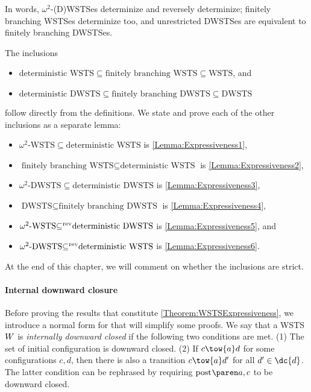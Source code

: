 \documentclass[../../diss.tex]{subfiles}
\begin{document}
In words, $\omega^2$-(D)WSTSes determinize and reversely determinize; finitely branching WSTSes determinize too, and unrestricted DWSTSes are equivalent to finitely branching DWSTSes.

The inclusions
\begin{itemize}
    \item
        $\text{deterministic WSTS} \subseteq  \text{finitely branching WSTS} \subseteq \text{WSTS}$, and
    \item
        $\text{deterministic DWSTS} \subseteq  \text{finitely branching DWSTS} \subseteq \text{DWSTS}$
\end{itemize}
follow directly from the definitions.
We state and prove each of the other inclusions as a separate lemma:
\begin{itemize}
    \item
        $\text{$\omega^2$-WSTS} \subseteq  \text{deterministic WSTS}$
        is \cref{Lemma:Expressiveness1},
    \item
        $\text{finitely branching WSTS} \subseteq  \text{deterministic WSTS}$
        is \cref{Lemma:Expressiveness2},
    \item
        $\text{$\omega^2$-DWSTS} \subseteq  \text{deterministic DWSTS}$
        is \cref{Lemma:Expressiveness3},
    \item
        $\text{DWSTS} \subseteq \text{finitely branching DWSTS}$
        is \cref{Lemma:Expressiveness4},
    \item
        $\text{$\omega^2$-WSTS} {\mathrel{\subseteq^{\text{rev}}}} \text{deterministic DWSTS}$
        is \cref{Lemma:Expressiveness5}, and
    \item
        $\text{$\omega^2$-DWSTS} {\mathrel{\subseteq^{\text{rev}}}} \text{deterministic WSTS}$
        is \cref{Lemma:Expressiveness6}.
\end{itemize}

At the end of this chapter, we will comment on whether the inclusions are strict.

\paragraph{Internal downward closure}

Before proving the results that constitute \cref{Theorem:WSTSExpressiveness}, we introduce a normal form for  that will simplify some proofs.
We say that a WSTS $W$ is \emph{internally downward closed} if the following two conditions are met.
(1) The set of initial configuration is downward closed.
(2) If $c \tow{a} d$ for some configurations $c,d$, then there is also a transition $c \tow{a} d'$ for all $d' \in \dc{d}$.
The latter condition can be rephrased by requiring $\post{}{a}{c}$ to be downward closed.
\end{document}
